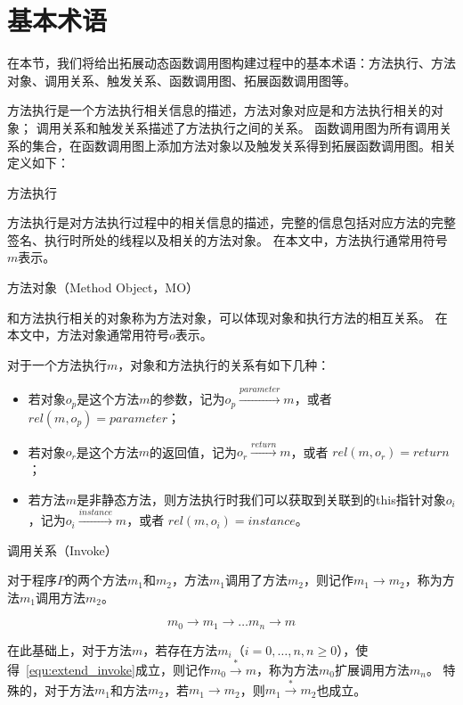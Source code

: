 \chapter{基本术语}


在本节，我们将给出拓展动态函数调用图构建过程中的基本术语：方法执行、方法对象、调用关系、触发关系、函数调用图、拓展函数调用图等。

方法执行是一个方法执行相关信息的描述，方法对象对应是和方法执行相关的对象；
调用关系和触发关系描述了方法执行之间的关系。
函数调用图为所有调用关系的集合，在函数调用图上添加方法对象以及触发关系得到拓展函数调用图。相关定义如下：

\begin{myDef}方法执行\end{myDef}
	
	
	方法执行是对方法执行过程中的相关信息的描述，完整的信息包括对应方法的完整签名、执行时所处的线程以及相关的方法对象。
	在本文中，方法执行通常用符号$m$表示。


\begin{myDef}
	方法对象（Method Object，MO）
\end{myDef}
	和方法执行相关的对象称为方法对象，可以体现对象和执行方法的相互关系。
	在本文中，方法对象通常用符号$o$表示。
	
	
	对于一个方法执行$m$，对象和方法执行的关系有如下几种：
	\begin{itemize}
		\item 若对象$o_p$是这个方法$m$的参数，记为$o_p \stackrel{parameter}{\longrightarrow} m$，或者 $ rel(m,o_p) = parameter$；
		\item 若对象$o_r$是这个方法$m$的返回值，记为$o_r \stackrel{return}{\longrightarrow} m$，或者 $ rel(m,o_r) = return$；
		\item 若方法$m$是非静态方法，则方法执行时我们可以获取到关联到的this指针对象$o_i$，记为$o_i \stackrel{instance}{\longrightarrow} m$，或者 $ rel(m,o_i) = instance$。
	\end{itemize}


\begin{myDef}
	调用关系（Invoke）
\end{myDef}
	对于程序$P$的两个方法$m_1$和$m_2$，方法$m_1$调用了方法$m_2$，则记作$m_1 \to m_2$，称为方法$m_1$调用方法$m_2$。

\begin{equation}
m_0 \to m_1 \to \dots m_n \to m  \label{equ:extend_invoke}
\end{equation}

在此基础上，对于方法$m$，若存在方法$m_i$（$i=0,\dots,n , n \geqslant 0$），使得~\autoref{equ:extend_invoke}成立，则记作$m_0 \stackrel{\ast}{\to} m$，称为方法$m_0$扩展调用方法$m_n$。
特殊的，对于方法$m_1$和方法$m_2$，若$m_1 \to m_2$，则$m_1  \stackrel{\ast}{\to}  m_2$也成立。

